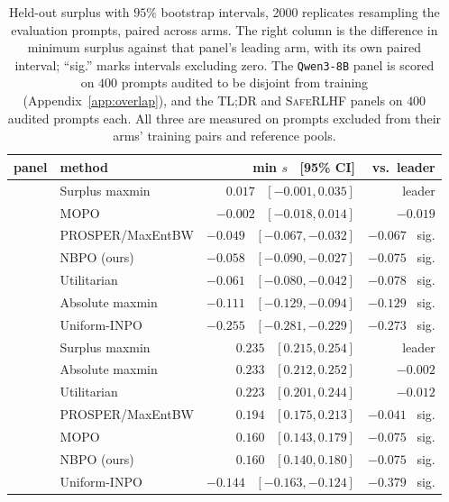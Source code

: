 \documentclass{article}
\theoremstyle{remark}
\theoremstyle{plain}
\newcommand{\NBPO}{\textsc{NBPO}}
\begin{document}
\begin{table}[htbp]
\centering\footnotesize
\setlength{\tabcolsep}{3.4pt}
\caption{Held-out surplus with $95\%$ bootstrap intervals, 2000 replicates resampling the evaluation
prompts, paired across arms. The right column is the difference in minimum surplus against that panel's
leading arm, with its own paired interval; ``sig.'' marks intervals excluding zero. The
\texttt{Qwen3-8B} panel is scored on $400$ prompts audited to be disjoint from training
(Appendix~\ref{app:overlap}), and the \textsc{TL;DR} and \textsc{SafeRLHF} panels on $400$ audited
prompts each. All three are measured on prompts excluded from their arms' training pairs and reference
pools.}
\label{tab:bootstrap-ci}
\begin{tabular}{llrr}
\toprule
panel & method & min $s$ \ [95\% CI] & vs.\ leader\\
\midrule
{}
 & Surplus maxmin & $0.017$ \ $[-0.001, 0.035]$ & leader\\
 & MOPO & $-0.002$ \ $[-0.018, 0.014]$ & $-0.019$\\
 & PROSPER/MaxEntBW & $-0.049$ \ $[-0.067, -0.032]$ & $-0.067$ \ sig.\\
 & \NBPO{} (ours) & $-0.058$ \ $[-0.090, -0.027]$ & $-0.075$ \ sig.\\
 & Utilitarian & $-0.061$ \ $[-0.080, -0.042]$ & $-0.078$ \ sig.\\
 & Absolute maxmin & $-0.111$ \ $[-0.129, -0.094]$ & $-0.129$ \ sig.\\
 & Uniform-INPO & $-0.255$ \ $[-0.281, -0.229]$ & $-0.273$ \ sig.\\
\midrule
{}
 & Surplus maxmin & $0.235$ \ $[0.215, 0.254]$ & leader\\
 & Absolute maxmin & $0.233$ \ $[0.212, 0.252]$ & $-0.002$\\
 & Utilitarian & $0.223$ \ $[0.201, 0.244]$ & $-0.012$\\
 & PROSPER/MaxEntBW & $0.194$ \ $[0.175, 0.213]$ & $-0.041$ \ sig.\\
 & MOPO & $0.160$ \ $[0.143, 0.179]$ & $-0.075$ \ sig.\\
 & \NBPO{} (ours) & $0.160$ \ $[0.140, 0.180]$ & $-0.075$ \ sig.\\
 & Uniform-INPO & $-0.144$ \ $[-0.163, -0.124]$ & $-0.379$ \ sig.\\

\end{tabular}
\end{table}
\end{document}
